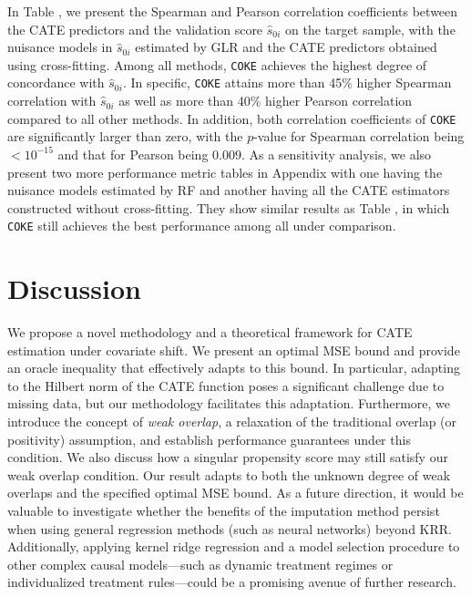 \documentclass[12pt,a4paper,pdftex,onepage]{article}
\begin{document}
In Table , we present the Spearman and Pearson correlation coefficients between the CATE predictors and the validation score $\hat{s}_{0i}$ on the target sample, with the nuisance models in $\hat{s}_{0i}$ estimated by GLR and the CATE predictors obtained using cross-fitting. Among all methods, \texttt{COKE} achieves the highest degree of concordance with $\hat{s}_{0i}$. In specific, \texttt{COKE} attains more than 45\% higher Spearman correlation with $\hat{s}_{0i}$ as well as more than 40\% higher Pearson correlation compared to all other methods. In addition, both correlation coefficients of \texttt{COKE} are significantly larger than zero, with the $p$-value for Spearman correlation being $<10^{-15}$ and that for Pearson being $0.009$. As a sensitivity analysis, we also present two more performance metric tables in Appendix  with one having the nuisance models estimated by RF and another having all the CATE estimators constructed without cross-fitting. They show similar results as Table , in which \texttt{COKE} still achieves the best performance among all under comparison.








\section{Discussion}

We propose a novel methodology and a theoretical framework for CATE estimation under covariate shift.
We present an optimal MSE bound and provide an oracle inequality that effectively adapts to this bound.
In particular, adapting to the Hilbert norm of the CATE function poses a significant challenge due to missing data, but our methodology facilitates this adaptation.
Furthermore, we introduce the concept of \textit{weak overlap}, a relaxation of the traditional overlap (or positivity) assumption, and establish performance guarantees under this condition.
We also discuss how a singular propensity score may still satisfy our weak overlap condition.
Our result adapts to both the unknown degree of weak overlaps and the specified optimal MSE bound.
As a future direction, it would be valuable to investigate whether the benefits of the imputation method persist when using general regression methods (such as neural networks) beyond KRR.
Additionally, applying kernel ridge regression and a model selection procedure to other complex causal models—such as dynamic treatment regimes or individualized treatment rules—could be a promising avenue of further research.
\end{document}
